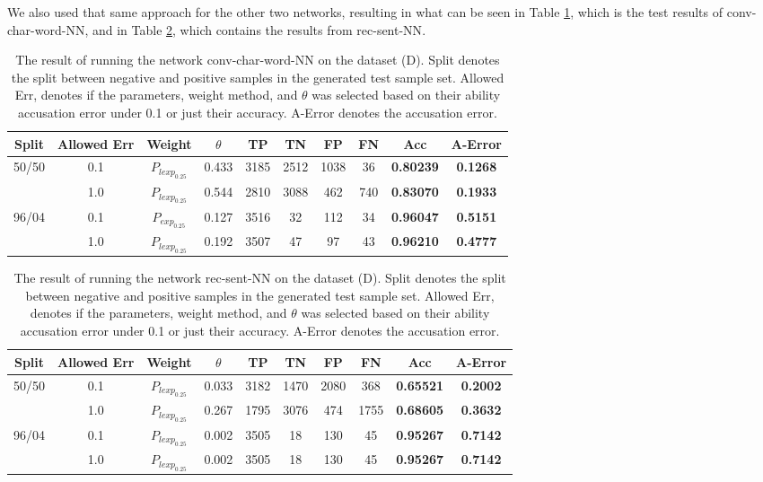 We also used that same approach for the other two networks, resulting in what
can be seen in Table \ref{tab:char_word_CNN_res}, which is the test results of
\gls{conv-char-word-NN}, and in Table \ref{tab:RNN_res}, which contains the
results from \gls{rec-sent-NN}.

\begin{table}[]
\begin{tabular}{|c|c|c|c|c|c|c|c||c|c|}
\hline
Split & Allowed Err & Weight & $\theta$ & TP & TN & FP & FN & \textbf{Acc} & \textbf{A-Error} \\ \hline
\multirow{2}{*}{50/50} & 0.1 & $P_{lexp_{0.25}}$ & 0.433 & 3185 & 2512 & 1038 & 36 & \textbf{0.80239} & \textbf{0.1268} \\ \cline{2-10} 
 & 1.0 & $P_{lexp_{0.25}}$ & 0.544 & 2810 & 3088 & 462 & 740 & \textbf{0.83070} & \textbf{0.1933} \\ \hline
\multirow{2}{*}{96/04} & 0.1 & $P_{exp_{0.25}}$ & 0.127 & 3516 & 32 & 112 & 34 & \textbf{0.96047} & \textbf{0.5151} \\ \cline{2-10} 
 & 1.0 & $P_{lexp_{0.25}}$ & 0.192 & 3507 & 47 & 97 & 43 & \textbf{0.96210} & \textbf{0.4777} \\ \hline
\end{tabular}
\caption{The result of running the network \gls{conv-char-word-NN} on the
dataset (D). Split denotes the split between negative and positive samples in
the generated test sample set. Allowed Err, denotes if the parameters, weight
method, and $\theta$ was selected based on their ability accusation error under
0.1 or just their accuracy. A-Error denotes the accusation error.}
\label{tab:char_word_CNN_res}
\end{table}

\begin{table}[]
\begin{tabular}{|c|c|c|c|c|c|c|c||c|c|}
\hline
Split & Allowed Err & Weight & $\theta$ & TP & TN & FP & FN & \textbf{Acc} & \textbf{A-Error} \\ \hline
\multirow{2}{*}{50/50} & 0.1 & $P_{lexp_{0.25}}$ & 0.033 & 3182 & 1470 & 2080 & 368 & \textbf{0.65521} & \textbf{0.2002} \\ \cline{2-10} 
 & 1.0 & $P_{lexp_{0.25}}$ & 0.267 & 1795 & 3076 & 474 & 1755 & \textbf{0.68605} & \textbf{0.3632} \\ \hline
\multirow{2}{*}{96/04} & 0.1 & $P_{lexp_{0.25}}$ & 0.002 & 3505 & 18 & 130 & 45 & \textbf{0.95267} & \textbf{0.7142} \\ \cline{2-10} 
 & 1.0 & $P_{lexp_{0.25}}$ & 0.002 & 3505 & 18 & 130 & 45 & \textbf{0.95267} & \textbf{0.7142} \\ \hline
\end{tabular}
\caption{The result of running the network \gls{rec-sent-NN} on the
dataset (D). Split denotes the split between negative and positive samples in
the generated test sample set. Allowed Err, denotes if the parameters, weight
method, and $\theta$ was selected based on their ability accusation error under
0.1 or just their accuracy. A-Error denotes the accusation error.}
\label{tab:RNN_res}
\end{table}


